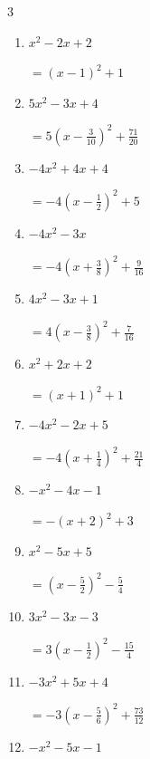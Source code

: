 \begin{multicols}{3}
\begin{enumerate}
        $\displaystyle =-4\left( x-\frac{1}{8}\right)^{2}-\frac{47}{16}$

  \item $x^{2}-2x+2$

        $\displaystyle =\left( x-1\right)^{2}+1$

  \item $5x^{2}-3x+4$

        $\displaystyle =5\left( x-\frac{3}{10}\right)^{2}+\frac{71}{20}$

  \item $-4x^{2}+4x+4$

        $\displaystyle =-4\left( x-\frac{1}{2}\right)^{2}+5$

\columnbreak %

\resetques

  \item $-4x^{2}-3x$

        $\displaystyle =-4\left( x+\frac{3}{8}\right)^{2}+\frac{9}{16}$

  \item $4x^{2}-3x+1$

        $\displaystyle =4\left( x-\frac{3}{8}\right)^{2}+\frac{7}{16}$

  \item $x^{2}+2x+2$

        $\displaystyle =\left( x+1\right)^{2}+1$

  \item $-4x^{2}-2x+5$

        $\displaystyle =-4\left( x+\frac{1}{4}\right)^{2}+\frac{21}{4}$

  \item $-x^{2}-4x-1$

        $\displaystyle =-\left( x+2\right)^{2}+3$

\columnbreak %

  \item $x^{2}-5x+5$

        $\displaystyle =\left( x-\frac{5}{2}\right)^{2}-\frac{5}{4}$

  \item $3x^{2}-3x-3$

        $\displaystyle =3\left( x-\frac{1}{2}\right)^{2}-\frac{15}{4}$

  \item $-3x^{2}+5x+4$

        $\displaystyle =-3\left( x-\frac{5}{6}\right)^{2}+\frac{73}{12}$

  \item $-x^{2}-5x-1$


\end{enumerate}
\end{multicols}
